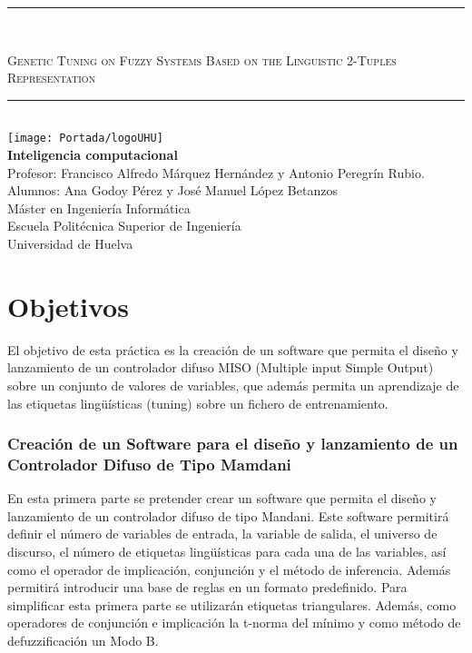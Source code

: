 \documentclass[12pt,a4paper]{article}
\begin{document}
\begin{titlepage}
\begin{center}
\rule{80mm}{0.1mm}\\		%
\bigskip
\begin{Huge}
\textsc{Genetic Tuning on Fuzzy Systems Based on the Linguistic 2-Tuples Representation\\}
\end{Huge}
\bigskip
\rule{80mm}{0.1mm}\\		%
\bigskip
\texttt{[image: Portada/logoUHU]}\\
\bigskip
\bigskip
\Large
\textbf{Inteligencia computacional}\\
\bigskip
\bigskip
\bigskip
\bigskip
\bigskip
\bigskip
Profesor: Francisco Alfredo Márquez Hernández y Antonio Peregrín Rubio.\\
Alumnos: Ana Godoy Pérez y José Manuel López Betanzos\\
\bigskip
\bigskip
\bigskip
Máster en Ingeniería Informática\\
Escuela Politécnica Superior de Ingeniería\\
Universidad de Huelva\\
\end{center}
\end{titlepage}


\thispagestyle{empty}
\tableofcontents
\renewcommand{\contentsname}{Índice}
\setcounter{tocdepth}{3}
\newpage


\part*{Objetivos}
El objetivo de esta práctica es la creación de un software que permita el diseño y lanzamiento de un controlador difuso MISO (Multiple input Simple Output) sobre un conjunto de valores de variables, que además permita un aprendizaje de las etiquetas lingüísticas (tuning) sobre un fichero de entrenamiento.

\section{Creación de un Software para el diseño y lanzamiento de un Controlador Difuso de Tipo Mamdani}
En esta primera parte se pretender crear un software que permita el diseño y lanzamiento de un controlador difuso de tipo Mandani. Este software permitirá definir el número de variables de entrada, la variable de salida, el universo de discurso, el número de etiquetas lingüísticas para cada una de las variables, así como el operador de implicación, conjunción y el método de inferencia. Además permitirá introducir una base de reglas en un formato
predefinido.
Para simplificar esta primera parte se utilizarán etiquetas triangulares. Además, como operadores de
conjunción e implicación la t-norma del mínimo y como método de defuzzificación un Modo B.
\end{document}
